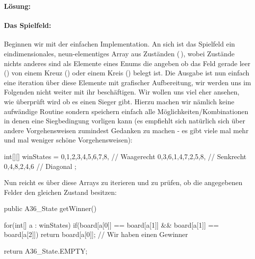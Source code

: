\documentclass[table]{sopra-base}
\makeatletter
\newenvironment{solution}{\null\par\noindent\textbf{\textcolor{sob@col@uulm@cs}{Lösung:}}\newline\bgroup\color{black}\slshape\ignorespaces}{\egroup}
\makeatother
\begin{document}
\begin{solution}
    \paragraph{Das Spielfeld:}
    Beginnen wir mit der einfachen Implementation. An sich ist das Spielfeld ein eindimensionales, neun-elementiges Array aus Zuständen (\,), wobei Zustände nichts anderes sind als Elemente eines Enums die angeben ob das Feld gerade leer () von einem Kreuz () oder einem Kreis () belegt ist. Die Ausgabe ist nun einfach eine iteration über diese Elemente mit grafischer Aufbereitung, wir werden uns im Folgenden nicht weiter mit ihr beschäftigen. Wir wollen uns viel eher ansehen, wie überprüft wird ob es einen Sieger gibt. Hierzu machen wir nämlich keine aufwändige Routine sondern speichern einfach alle Möglichkeiten/Kombinationen in denen eine Siegbedingung vorligen kann (es empfiehlt sich natürlich sich über andere Vorgehensweisen zumindest Gedanken zu machen - es gibt viele mal mehr und mal weniger schöne Vorgehensweisen):
{\upshape\begin{java*}
int[][] winStates = {{0,1,2},{3,4,5},{6,7,8}, // Waagerecht
                     {0,3,6},{1,4,7},{2,5,8}, // Senkrecht
                     {0,4,8},{2,4,6} // Diagonal
                    };
    \end{java*}
}
    Nun reicht es über diese Arrays zu iterieren und zu prüfen, ob die angegebenen Felder den gleichen Zustand besitzen:
\bgroup
{}
{\upshape
\begin{java}[firstnumber=68]
public A36_State getWinner(){
    for(int[] a : winStates)
        if(board[a[0]] == board[a[1]] && board[a[1]] == board[a[2]])
            return board[a[0]]; // Wir haben einen Gewinner

    return A36_State.EMPTY;
}
\end{java}
}

\end{solution}
\end{document}
